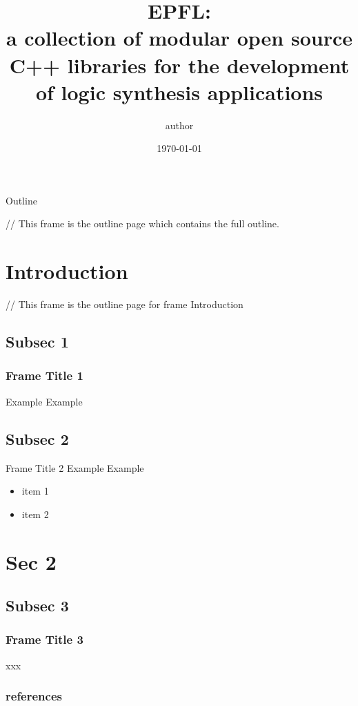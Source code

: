\documentclass[aspectratio=1610]{beamer}
\title{EPFL: \\a collection of modular open source C++ libraries for the development of logic synthesis applications}
\author{author}
\date\today
\begin{document}
\begin{frame}[plain]
  \titlepage
\end{frame}


\begin{frame}{Outline}
  \tableofcontents

  // This frame is the outline page which contains the full outline.
  \end{frame}

\section{Introduction}

\begin{frame}
  \tableofcontents[currentsection, subsectionstyle=show/show/hide]

  // This frame is the outline page for frame Introduction
\end{frame}


\subsection {Subsec 1}
\begin{frame}
  \frametitle{Frame Title 1}
  Example Example
\end{frame}


\subsection {Subsec 2}
\begin{frame}{Frame Title 2}
  Example Example\cite{bagaev_vdjdb_2020}

\begin{itemize}
    \item item 1
    \item item 2
\end{itemize}

\end{frame}


\section {Sec 2}

\begin{frame}
  \tableofcontents[currentsection, subsectionstyle=show/show/hide]
\end{frame}

\subsection {Subsec 3}
\begin{frame}
  \frametitle{Frame Title 3}
xxx
\end{frame}
\begin{frame}
	\frametitle{references}
	\nocite{*}%
	\printbibliography
\end{frame}
\end{document}
